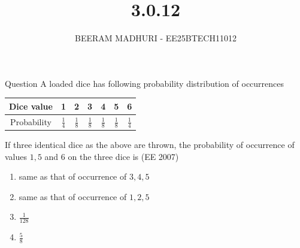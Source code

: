 \documentclass{beamer}
\title %
{3.0.12}
\author %
{BEERAM MADHURI - EE25BTECH11012}
\begin{document}
\frame{\titlepage}
\begin{frame}{Question}
A loaded dice has following probability distribution of occurrences

\begin{center}
\begin{tabular}{|c|c|c|c|c|c|c|}
\hline
Dice value & 1 & 2 & 3 & 4 & 5 & 6 \\
\hline
Probability & $\frac{1}{4}$ & $\frac{1}{8}$ & $\frac{1}{8}$ & $\frac{1}{8}$ & $\frac{1}{8}$ & $\frac{1}{4}$ \\
\hline
\end{tabular}
\end{center}

If three identical dice as the above are thrown, the probability of occurrence of values $1, 5$ and $6$ on the three dice is \hfill (EE 2007)

\begin{enumerate}
\item[(a)] same as that of occurrence of $3, 4, 5$
\item[(b)] same as that of occurrence of $1, 2, 5$
\item[(c)] $\frac{1}{128}$
\item[(d)] $\frac{5}{8}$
\end{enumerate}
\end{frame}
\end{document}
